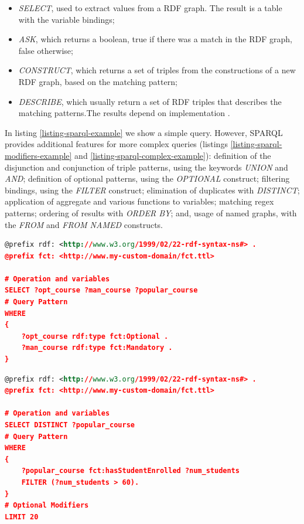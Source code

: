 \begin{itemize}
    \item \emph{SELECT}, used to extract values from a \gls{RDF} graph. The result is a table with the variable bindings;
    \item \emph{ASK}, which returns a boolean, true if there was a match in the \gls{RDF} graph, false otherwise; 
    \item \emph{CONSTRUCT}, which returns a set of triples from the constructions of a new \gls{RDF} graph, based on the matching pattern;
    \item \emph{DESCRIBE}, which usually return a set of RDF triples that describes the matching patterns.The results depend on implementation \autocite{Picalausa2011-ca}. 
\end{itemize}

In listing \ref{listing-sparql-example} we show a simple query. However, \gls{SPARQL} provides additional features for more complex queries (listings \ref{listing-sparql-modifiers-example} and \ref{listing-sparql-complex-example}): definition of the disjunction and conjunction of triple patterns, using the keywords \emph{UNION} and \emph{AND}; definition of optional patterns, using the \emph{OPTIONAL} construct; filtering bindings, using the \emph{FILTER} construct; elimination of duplicates with \emph{DISTINCT}; application of aggregate and various functions to variables; matching 
regex patterns; ordering of results with \emph{ORDER BY}; and, usage of named graphs, with the \emph{FROM} and \emph{FROM NAMED} constructs.

\begin{lstlisting}[language=XML, caption={Simple \gls{SPARQL} example}, label={listing-sparql-example}]
@prefix rdf: <http://www.w3.org/1999/02/22-rdf-syntax-ns#> .
@prefix fct: <http://www.my-custom-domain/fct.ttl>

# Operation and variables
SELECT ?opt_course ?man_course ?popular_course
# Query Pattern
WHERE
{
    ?opt_course rdf:type fct:Optional .
    ?man_course rdf:type fct:Mandatory .
}

\end{lstlisting}

\pagebreak

\begin{lstlisting}[language=XML, caption={\gls{SPARQL} query with filters and modifiers example}, label={listing-sparql-modifiers-example}]
@prefix rdf: <http://www.w3.org/1999/02/22-rdf-syntax-ns#> .
@prefix fct: <http://www.my-custom-domain/fct.ttl>

# Operation and variables
SELECT DISTINCT ?popular_course
# Query Pattern
WHERE
{
    ?popular_course fct:hasStudentEnrolled ?num_students
    FILTER (?num_students > 60).
}
# Optional Modifiers
LIMIT 20
\end{lstlisting}

